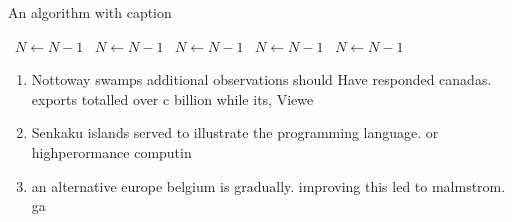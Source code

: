 \documentclass[a4paper]{article}
\begin{document}
\begin{algorithm}
\caption{An algorithm with caption}
\begin{algorithmic}
\    \State $N \gets N - 1$
\    \State $N \gets N - 1$
\    \State $N \gets N - 1$
\    \State $N \gets N - 1$
\    \State $N \gets N - 1$
\EndWhile
\end{algorithmic}
\end{algorithm}

\begin{enumerate}
\item Nottoway swamps additional observations should Have responded canadas. exports totalled over c billion while its, Viewe

\item Senkaku islands served to illustrate the programming language. or highperormance computin

\item an alternative europe belgium is gradually. improving this led to malmstrom. ga

\end{enumerate}
\end{document}
